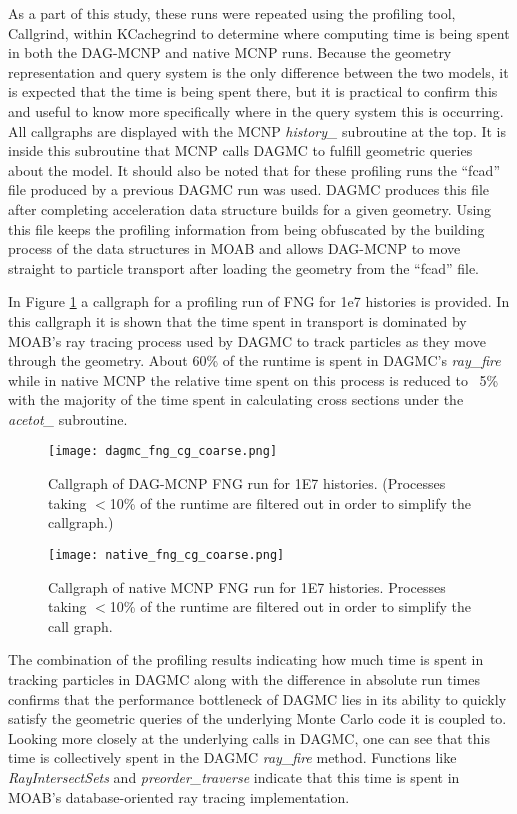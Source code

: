 As a part of this study, these runs were repeated using the profiling tool,
Callgrind, within KCachegrind to determine where computing time is being spent
in both the DAG-MCNP and native MCNP runs. Because the geometry representation
and query system is the only difference between the two models, it is expected
that the time is being spent there, but it is practical to confirm this and
useful to know more specifically where in the query system this is occurring. All
callgraphs are displayed with the MCNP \textit{history\_} subroutine at the
top. It is inside this subroutine that MCNP calls DAGMC to fulfill geometric
queries about the model. It should also be noted that for these profiling runs
the ``fcad'' file produced by a previous DAGMC run was used. DAGMC produces this
file after completing acceleration data structure builds for a given
geometry. Using this file keeps the profiling information from being obfuscated
by the building process of the data structures in MOAB and allows DAG-MCNP to
move straight to particle transport after loading the geometry from the ``fcad''
file.

In Figure \ref{dagmc-fng-coarse} a callgraph for a profiling run of FNG for 1e7
histories is provided. In this callgraph it is shown that the time spent in
transport is dominated by MOAB's ray tracing process used by DAGMC to track
particles as they move through the geometry. About 60\% of the runtime is spent
in DAGMC's \textit{ray\_fire} while in native MCNP the relative time spent on
this process is reduced to ~5\% with the majority of the time spent in
calculating cross sections under the \textit{acetot\_} subroutine.

\begin{figure}[H]
  \centering
  \caption{Callgraph of DAG-MCNP FNG run for \num{1E7} histories. (Processes taking
    $<$10\% of the runtime are filtered out in order to simplify the callgraph.)}
  \label{dagmc-fng-coarse}
  \texttt{[image: dagmc\_fng\_cg\_coarse.png]}
\end{figure}

\begin{figure}[H]
  \centering
  \caption{Callgraph of native MCNP FNG run for \num{1E7} histories. Processes taking
    $<$10\% of the runtime are filtered out in order to simplify the call
    graph.}
  \label{mcnp-fng-coarse}
  \texttt{[image: native\_fng\_cg\_coarse.png]}
\end{figure}


The combination of the profiling results indicating how much time is spent in
tracking particles in DAGMC along with the difference in absolute run times
confirms that the performance bottleneck of DAGMC lies in its ability to quickly
satisfy the geometric queries of the underlying Monte Carlo code it is coupled
to. Looking more closely at the underlying calls in DAGMC, one can see that this
time is collectively spent in the DAGMC \textit{ray\_fire} method. Functions
like \textit{RayIntersectSets} and \textit{preorder\_traverse} indicate that
this time is spent in MOAB's database-oriented ray tracing implementation.


